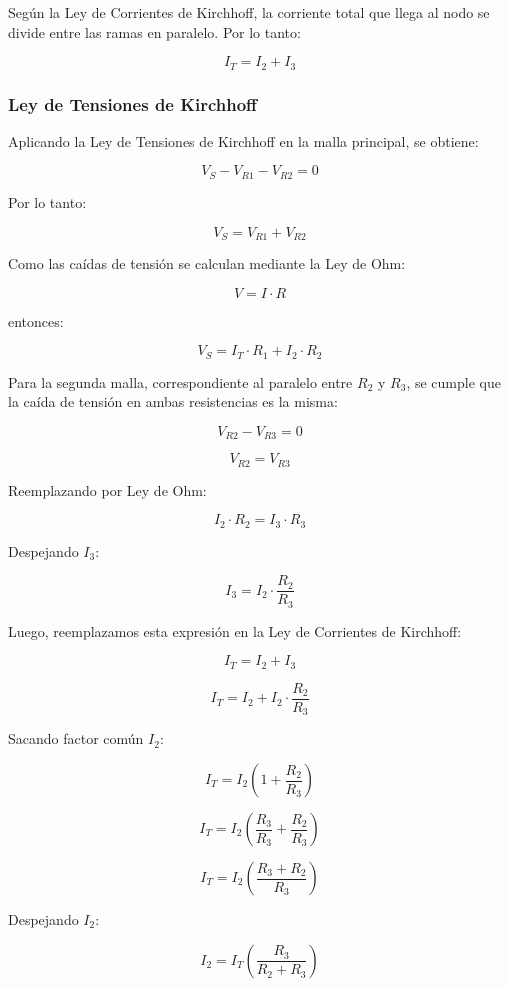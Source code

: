 \documentclass[a4paper,12pt]{article}
\begin{document}
	Según la Ley de Corrientes de Kirchhoff, la corriente total que llega al nodo se divide entre las
	ramas en paralelo. Por lo tanto:
	
	\[
	I_T = I_2 + I_3
	\]
	
	\subsubsection*{Ley de Tensiones de Kirchhoff}
	
	Aplicando la Ley de Tensiones de Kirchhoff en la malla principal, se obtiene:
	
	\[
	V_S - V_{R1} - V_{R2} = 0
	\]
	
	Por lo tanto:
	
	\[
	V_S = V_{R1} + V_{R2}
	\]
	
	Como las caídas de tensión se calculan mediante la Ley de Ohm:
	
	\[
	V = I \cdot R
	\]
	
	entonces:
	
	\[
	V_S = I_T \cdot R_1 + I_2 \cdot R_2
	\]
	
	Para la segunda malla, correspondiente al paralelo entre $R_2$ y $R_3$, se cumple que la caída de
	tensión en ambas resistencias es la misma:
	
	\[
	V_{R2} - V_{R3} = 0
	\]
	
	\[
	V_{R2} = V_{R3}
	\]
	
	Reemplazando por Ley de Ohm:
	
	\[
	I_2 \cdot R_2 = I_3 \cdot R_3
	\]
	
	Despejando $I_3$:
	
	\[
	I_3 = I_2 \cdot \frac{R_2}{R_3}
	\]
	
	Luego, reemplazamos esta expresión en la Ley de Corrientes de Kirchhoff:
	
	\[
	I_T = I_2 + I_3
	\]
	
	\[
	I_T = I_2 + I_2 \cdot \frac{R_2}{R_3}
	\]
	
	Sacando factor común $I_2$:
	
	\[
	I_T = I_2 \left(1 + \frac{R_2}{R_3}\right)
	\]
	
	\[
	I_T = I_2 \left(\frac{R_3}{R_3} + \frac{R_2}{R_3}\right)
	\]
	
	\[
	I_T = I_2 \left(\frac{R_3 + R_2}{R_3}\right)
	\]
	
	Despejando $I_2$:
	
	\[
	I_2 = I_T \left(\frac{R_3}{R_2 + R_3}\right)
	\]
	
\end{document}
